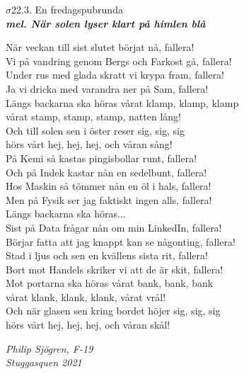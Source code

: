 \documentclass[a6paper,10pt]{article}
\newcommand{\mel}[1]{\small\textbf{\textit{mel. #1 \\}}}
\begin{document}
\setlength{\oddsidemargin}{-0.47in}

\begin{center}
\Large $\sigma22.3$. En fredagspubrunda\\
\mel{När solen lyser klart på himlen blå} 
\end{center}

När veckan till sist slutet börjat nå, fallera!\\
Vi på vandring genom Bergs och Farkost gå, fallera!\\
Under rus med glada skratt vi krypa fram, fallera!\\
Ja vi dricka med varandra ner på Sam, fallera!
\vspace{5pt}\\
Längs backarna ska höras vårat klamp, klamp, klamp\\
vårat stamp, stamp, stamp, natten lång!\\
Och till solen sen i öster reser sig, sig, sig\\
hörs vårt hej, hej, hej, och våran sång!
\vspace{5pt}\\
På Kemi så kastas pingisbollar runt, fallera!\\
Och på Indek kastar nån en sedelbunt, fallera!\\
Hos Maskin så tömmer nån en öl i hals, fallera!\\
Men på Fysik ser jag faktiskt ingen alls, fallera!
\vspace{5pt}\\
Längs backarna ska höras...
\vspace{5pt}\\
Sist på Data frågar nån om min LinkedIn, fallera!\\
Börjar fatta att jag knappt kan se någonting, fallera!\\
Stad i ljus och sen en kvällens sista rit, fallera!\\
Bort mot Handels skriker vi att de är skit, fallera!
\vspace{5pt}\\
Mot portarna ska höras vårat bank, bank, bank\\
vårat klank, klank, klank, vårat vrål!\\
Och när glasen sen kring bordet höjer sig, sig, sig\\
hörs vårt hej, hej, hej, och våran skål!\\


\begin{flushright}
\textit{Philip Sjögren, F-19 \\Stuggasquen 2021}
\end{flushright}
\end{document}
